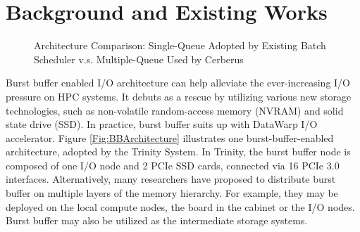 \section{Background and Existing Works}
\label{Sec:Background}

\begin{figure}[h]
\centering
{}
\caption{Architecture Comparison: Single-Queue Adopted by Existing Batch Scheduler v.s. Multiple-Queue Used by Cerberus}
\label{Fig:CompareSlurmCerbuers}
\end{figure}

Burst buffer enabled I/O architecture can help alleviate
the ever-increasing I/O pressure on HPC systems.
It debuts as a rescue by utilizing various new storage technologies,
such as non-volatile random-access memory (NVRAM) and solid state drive (SSD).
In practice, burst buffer suits up with DataWarp I/O accelerator\cite{DataWarp}.
Figure \ref{Fig:BBArchitecture} illustrates one burst-buffer-enabled architecture,
adopted by the Trinity System\cite{TrinitySystem}.
In Trinity, the burst buffer node is composed of one I/O node and 2 PCIe SSD cards,
connected via 16 PCIe 3.0 interfaces.
Alternatively, many researchers have proposed to distribute burst buffer 
on multiple layers of the memory hierarchy\cite{Romanus:CORR:15}.
For example, they may be deployed on the local compute nodes, the board in the cabinet or the I/O nodes.
Burst buffer may also be utilized as the intermediate storage systems.


